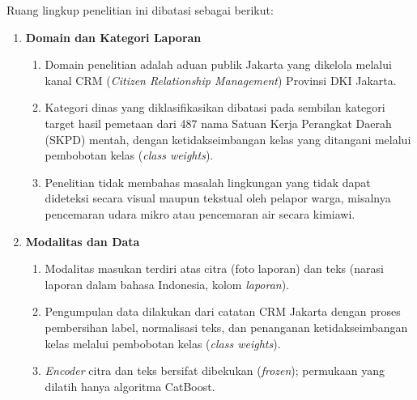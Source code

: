 Ruang lingkup penelitian ini dibatasi sebagai berikut:

\begin{enumerate}
    \item \textbf{Domain dan Kategori Laporan}
    \begin{enumerate}
        \item Domain penelitian adalah aduan publik Jakarta yang dikelola melalui kanal CRM (\textit{Citizen Relationship Management}) Provinsi DKI Jakarta.
        \item Kategori dinas yang diklasifikasikan dibatasi pada sembilan kategori target hasil pemetaan dari 487 nama Satuan Kerja Perangkat Daerah (SKPD) mentah, dengan ketidakseimbangan kelas yang ditangani melalui pembobotan kelas (\textit{class weights}).
        \item Penelitian tidak membahas masalah lingkungan yang tidak dapat dideteksi secara visual maupun tekstual oleh pelapor warga, misalnya pencemaran udara mikro atau pencemaran air secara kimiawi.
    \end{enumerate}

    \item \textbf{Modalitas dan Data}
    \begin{enumerate}
        \item Modalitas masukan terdiri atas citra (foto laporan) dan teks (narasi laporan dalam bahasa Indonesia, kolom \textit{laporan}).
        \item Pengumpulan data dilakukan dari catatan CRM Jakarta dengan proses pembersihan label, normalisasi teks, dan penanganan ketidakseimbangan kelas melalui pembobotan kelas (\textit{class weights}).
        \item \textit{Encoder} citra dan teks bersifat dibekukan (\textit{frozen}); permukaan yang dilatih hanya algoritma CatBoost.
    \end{enumerate}


\end{enumerate}
